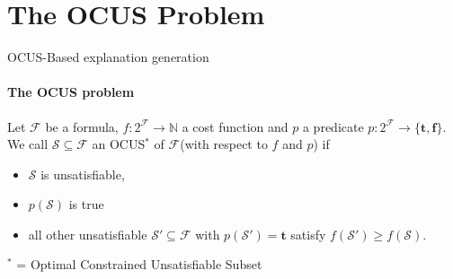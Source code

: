 \documentclass{beamer}
\newcommand\m[1]{\ensuremath{\mathcal{#1}}\xspace}
\newcommand\formula{\ensuremath{\m{F} }\xspace}
\renewcommand\emph[1]{{\color{vuborange}#1}}
\newcommand\nat{\m{\mathbb{N}}}
\newcommand\subsetT{\m{\mathcal{S}}}
\newcommand\ltrue{\m{\textbf{t}}}
\newcommand\lfalse{\m{\textbf{f}}}
\begin{document}
	
	
	
	\section{The OCUS Problem}
			\begin{frame}{OCUS-Based explanation generation}
			\framesubtitle{The OCUS problem}
			\begin{definition}
				\small
				Let $\formula$ be a formula, $f:2^{\formula} \to \nat$ a cost function and  $p$ a predicate $p: 2^{\formula}\to \{\ltrue,\lfalse\}$. We call %
					$\subsetT \subseteq \formula$ an \emph{OCUS}$^*$ of \formula (with respect to $f$ and $p$) if \begin{itemize}                                      
						\item $\subsetT$ is unsatisfiable,
						\item $p(\subsetT)$ is true
						\item \emph{all other unsatisfiable $\subsetT'\subseteq \formula$ with $p(\subsetT')=\ltrue$ satisfy $f(\subsetT')\geq f(\subsetT)$}.
					\end{itemize}
				\end{definition}
				$^*$ = Optimal \emph{Constrained} Unsatisfiable Subset
			\end{frame}		
			
\end{document}
